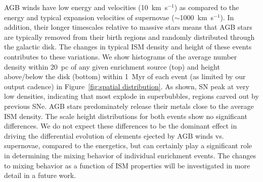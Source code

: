 \documentclass[twocolumn]{aastex61}
\begin{document}
AGB winds have low energy and velocities (10~km~s$^{-1}$) as compared to the energy and typical expansion velocities of supernovae ($\sim$1000~km~s$^{-1}$). In addition, their longer timescales relative to massive stars means that AGB stars are typically removed from their birth regions and randomly distributed through the galactic disk. The changes in typical ISM density and height of these events contributes to these variations. We show histograms of the average number density within 20~pc of any given enrichment source (top) and height above/below the disk (bottom) within 1~Myr of each event (as limited by our output cadence) in Figure~\ref{fig:spatial distribution}. As shown, SN peak at very low densities, indicating that most explode in superbubbles, regions carved out by previous SNe. AGB stars predominately release their metals close to the average ISM density. The scale height distributions for both events show no significant differences. We do not expect these differences to be the dominant effect in driving the differential evolution of elements ejected by AGB winds vs. supernovae, compared to the energetics, but can certainly play a significant role in determining the mixing behavior of individual enrichment events. The changes to mixing behavior as a function of ISM properties will be investigated in more detail in a future work.
\end{document}
